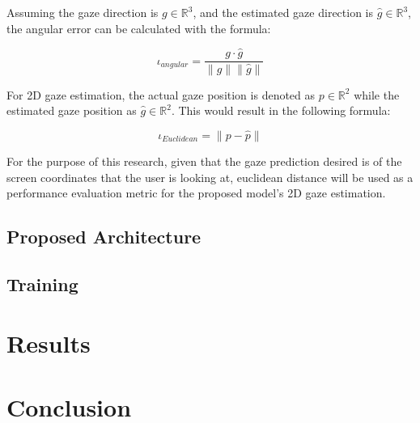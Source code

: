 Assuming the gaze direction is \boldmath $g \in \mathbb{R}^3$, and the estimated gaze direction is
\boldmath $\hat{g}  \in \mathbb{R}^3$, the angular error can be calculated with the formula:

\begin{equation} \iota _{angular} = \frac{g \cdot  \hat{g} }{ \|g\|\|\hat{g}\| } \end{equation}

For 2D gaze estimation, the actual gaze position is denoted as 
\boldmath $p \in \mathbb{R}^2$ while the estimated gaze position as
\boldmath $\hat{g} \in \mathbb{R}^2$. This would result in the following formula:

\begin{equation} \iota _{Euclidean} = \| p - \hat{p} \|  \end{equation}

For the purpose of this research, given that the gaze prediction desired is of the screen coordinates that the user is looking at, euclidean distance will be used
as a performance evaluation metric for the proposed model's 2D gaze estimation.

\section{Proposed Architecture}

\section{Training}

\chapter{Results}
\label{Chap4}


\chapter{Conclusion}
\label{Chap5}
